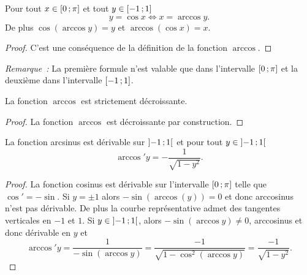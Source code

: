 \begin{prop}
  Pour tout \(x \in \left[ 0 \, ; {} \pi \right]\) et tout \(y \in
  \left[ -1 \, ; {} 1 \right]\)
  \begin{equation}
    y = \cos x \iff{} x = \arccos y.
  \end{equation}
  De plus \(\cos( \arccos y) = y\) et \(\arccos(\cos x) = x\).
\end{prop}

\begin{proof}
  C'est une conséquence de la définition de la fonction \(\arccos\).
\end{proof}

\emph{Remarque~:} La première formule n'est valable que dans l'intervalle
\(\left[ 0 \, ; {} \pi \right]\) et la deuxième dans l'intervalle
\(\left[ -1 \, ; {} 1 \right]\).

\begin{prop}
  La fonction \(\arccos\) est strictement décroissante.
\end{prop}

\begin{proof}
  La fonction \(\arccos\) est décroissante par construction.
\end{proof}

\begin{prop}
  La fonction arcsinus est dérivable sur \(\left] -1 \, ; {} 1 \right[\) et pour tout
  \(y \in \left] -1 \, ; {} 1 \right[\)
  \begin{equation}
    \arccos'y = -\frac{1}{\sqrt{1-y^2}}.
  \end{equation}
\end{prop}

\begin{proof}
  La fonction cosinus est dérivable sur l'intervalle \(\left[ 0 \, ; {} \pi \right]\)
  telle que \(\cos' = -\sin\). Si \(y = \pm 1\) alors \(-\sin(\arccos(y)) = 0\)
  et donc arccosinus n'est pas dérivable. De plus la courbe représentative
  admet des tangentes verticales en \(-1\) et \(1\). Si \(y \in
  \left] -1 \, ; {} 1 \right[\), alors \(-\sin(\arccos y) \neq 0\), arccosinus et donc
  dérivable en \(y\) et
  \[\arccos' y = \frac{1}{-\sin( \arccos y)} = \frac{-1}{\sqrt{1-\cos^2(\arccos
  y)}} = \frac{-1}{\sqrt{1-y^2}}.\]
\end{proof}

